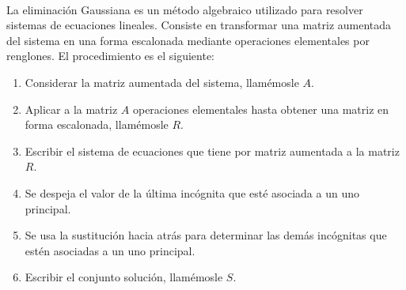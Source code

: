 \begin{adjustwidth}{-7.6cm}{-2cm}
    \begin{tcolorbox}[
        theorem style=change break,
        enhanced,
        breakable,
        boxrule=0pt,
        frame hidden,
        left = 1.8cm,
        right = 1.8cm,
        top=4mm,
        bottom=2mm,
        colback=black!7!white,
        coltitle=black,
        attach title to upper={\ },
        sharp corners,
        borderline north={1.5pt}{0pt}{black},
        title = {Método de eliminación Gaussiana:},
        fonttitle=\selectfont\Lato\bfseries\LARGE,
        fontupper=\normalsize
    ]
        \,\\[4mm]
        La eliminación Gaussiana es un método algebraico utilizado para resolver sistemas de ecuaciones lineales. Consiste en transformar una matriz aumentada del sistema en una forma escalonada mediante operaciones elementales por renglones. El procedimiento es el siguiente:\vspace{0.3cm}
        \begin{enumerate}
            \item Considerar la matriz aumentada del sistema, llamémosle $A$.
            \item Aplicar a la matriz $A$ operaciones elementales hasta obtener una matriz en forma escalonada, llamémosle $R$.
            \item Escribir el sistema de ecuaciones que tiene por matriz aumentada a la matriz $R$.
            \item Se despeja el valor de la última incógnita que esté asociada a un uno principal.
            \item Se usa la sustitución hacia atrás para determinar las demás incógnitas que estén asociadas a un uno principal.
            \item Escribir el conjunto solución, llamémosle $S$.
        \end{enumerate}
    \end{tcolorbox}
\end{adjustwidth}

\newpage

